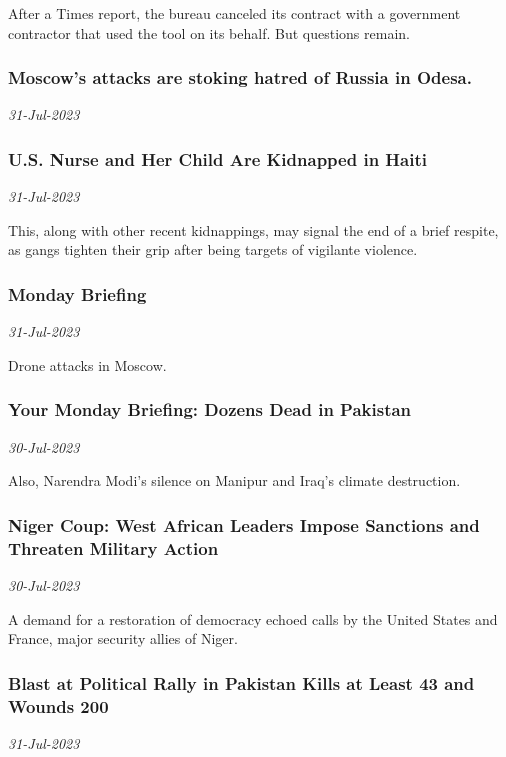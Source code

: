 After a Times report, the bureau canceled its contract with a government contractor that used the tool on its behalf. But questions remain.
\subsubsection{Moscow’s attacks are stoking hatred of Russia in Odesa. \href{https://www.nytimes.com/2023/07/31/world/europe/moscows-attacks-are-stoking-hatred-of-russia-in-odesa.html}{}}
\textit{31-Jul-2023}


\subsubsection{U.S. Nurse and Her Child Are Kidnapped in Haiti \href{https://www.nytimes.com/2023/07/31/world/americas/haiti-kidnapping-nurse.html}{}}
\textit{31-Jul-2023}

This, along with other recent kidnappings, may signal the end of a brief respite, as gangs tighten their grip after being targets of vigilante violence.
\subsubsection{Monday Briefing \href{https://www.nytimes.com/2023/07/31/briefing/moscow-drones-pakistan-blast-niger.html}{}}
\textit{31-Jul-2023}

Drone attacks in Moscow.
\subsubsection{Your Monday Briefing: Dozens Dead in Pakistan \href{https://www.nytimes.com/2023/07/30/briefing/pakistan-blast-attack-manipur-asia.html}{}}
\textit{30-Jul-2023}

Also, Narendra Modi’s silence on Manipur and Iraq’s climate destruction.
\subsubsection{Niger Coup: West African Leaders Impose Sanctions and Threaten Military Action \href{https://www.nytimes.com/2023/07/30/world/africa/west-africa-niger-coup.html}{}}
\textit{30-Jul-2023}

A demand for a restoration of democracy echoed calls by the United States and France, major security allies of Niger.
\subsubsection{Blast at Political Rally in Pakistan Kills at Least 43 and Wounds 200 \href{https://www.nytimes.com/2023/07/30/world/asia/pakistan-rally-explosion.html}{}}
\textit{31-Jul-2023}

